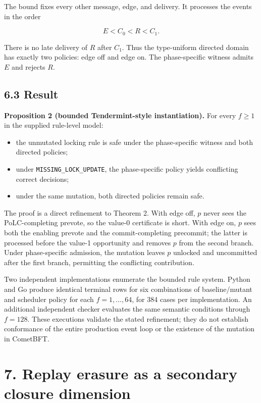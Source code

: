 The bound fixes every other message, edge, and delivery. It processes
the events in the order

\[
E < C_0 < R < C_1.
\]

There is no late delivery of \(R\) after \(C_1\). Thus the type-uniform
directed domain has exactly two policies: edge off and edge on. The
phase-specific witness admits \(E\) and rejects \(R\).

\subsection{6.3 Result}\label{result}

\textbf{Proposition 2 (bounded Tendermint-style instantiation).} For
every \(f\geq1\) in the supplied rule-level model:

\begin{itemize}
\tightlist
\item
  the unmutated locking rule is safe under the phase-specific witness
  and both directed policies;
\item
  under \texttt{MISSING\_LOCK\_UPDATE}, the phase-specific policy yields
  conflicting correct decisions;
\item
  under the same mutation, both directed policies remain safe.
\end{itemize}

The proof is a direct refinement to Theorem 2. With edge off, \(p\)
never sees the PoLC-completing prevote, so the value-0 certificate is
short. With edge on, \(p\) sees both the enabling prevote and the
commit-completing precommit; the latter is processed before the value-1
opportunity and removes \(p\) from the second branch. Under
phase-specific admission, the mutation leaves \(p\) unlocked and
uncommitted after the first branch, permitting the conflicting
contribution.

Two independent implementations enumerate the bounded rule system.
Python and Go produce identical terminal rows for six combinations of
baseline/mutant and scheduler policy for each \(f=1,\ldots,64\), for 384
cases per implementation. An additional independent checker evaluates
the same semantic conditions through \(f=128\). These executions
validate the stated refinement; they do not establish conformance of the
entire production event loop or the existence of the mutation in
CometBFT.

\section{7. Replay erasure as a secondary closure
dimension}\label{replay-erasure-as-a-secondary-closure-dimension}

